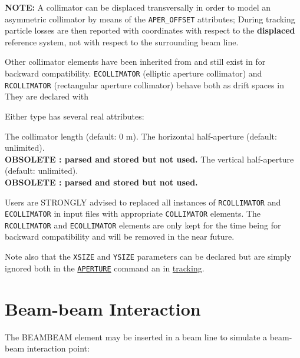 \textbf{NOTE:} A collimator can be displaced transversally in order to
model an asymmetric collimator by means of the \texttt{APER\_OFFSET} attributes;
During tracking particle losses are then reported with coordinates with respect
to the \textbf{displaced} reference system, not with respect to the surrounding
beam line.

Other collimator elements have been inherited from \madeight and still exist
in \madx for backward compatibility.
\texttt{ECOLLIMATOR} (elliptic aperture collimator) and \texttt{RCOLLIMATOR}
(rectangular aperture collimator) behave both as drift spaces in \madx
They are declared with


Either type has several real attributes:
\begin{madlist}
   The collimator length (default: 0 m).
   The horizontal half-aperture (default: unlimited). \\
  \textbf{OBSOLETE : parsed and stored but not used.}
   The vertical half-aperture (default: unlimited). \\
  \textbf{OBSOLETE : parsed and stored but not used.}
\end{madlist}

Users are STRONGLY advised to replaced all instances of \texttt{RCOLLIMATOR}
and \texttt{ECOLLIMATOR} in input files with appropriate \texttt{COLLIMATOR}
elements. The \texttt{RCOLLIMATOR} and \texttt{ECOLLIMATOR} elements are only
kept for the time being for backward compatibility and will be removed in
the near future.

Note also that the \texttt{XSIZE} and \texttt{YSIZE} parameters can be declared
but are simply ignored both in the \hyperref[chap:aperture]{\texttt{APERTURE}}
command an in \hyperref[chap:thintrack]{tracking}.


\section{Beam-beam Interaction}
The BEAMBEAM element may be inserted in a beam line to simulate a
beam-beam interaction point:


